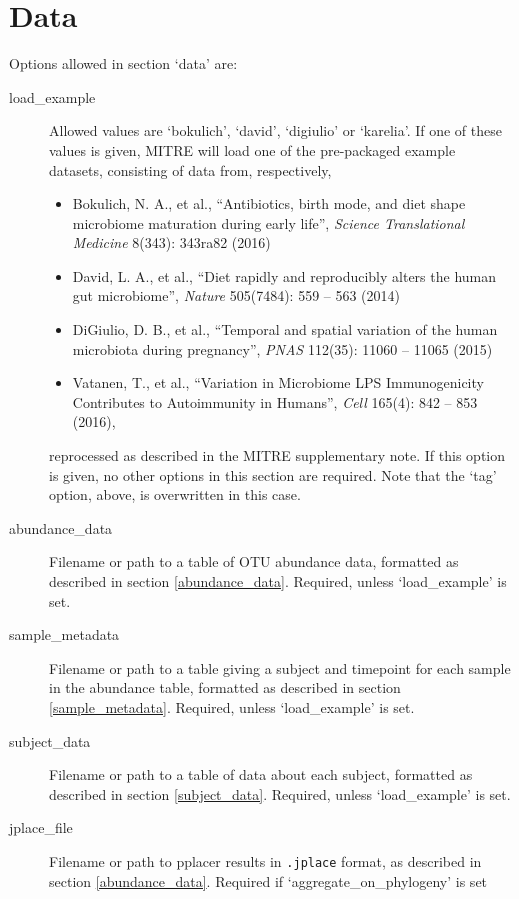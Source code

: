 \documentclass[12pt]{report}
\begin{document}
\section{Data}\label{data}
Options allowed in section `data' are:
\begin{description}
\item[load\_example] Allowed values are `bokulich', `david',
  `digiulio' or `karelia'. If one of these values is given,
  MITRE will load one of the pre-packaged example datasets, consisting
  of data from, respectively, \begin{itemize}
  \item Bokulich, N. A., et al., ``Antibiotics, birth mode, and diet
    shape microbiome maturation during early life'', \textit{Science
      Translational Medicine} 8(343): 343ra82 (2016)
  \item David, L. A., et al., ``Diet rapidly and reproducibly alters
    the human gut microbiome'', \textit{Nature} 505(7484): 559 -- 563
    (2014)
  \item DiGiulio, D. B., et al., ``Temporal and spatial variation of
    the human microbiota during pregnancy'', \textit{PNAS} 112(35):
    11060 -- 11065 (2015)
  \item Vatanen, T., et al., ``Variation in Microbiome LPS
    Immunogenicity Contributes to Autoimmunity in Humans'',
    \textit{Cell} 165(4): 842 -- 853 (2016),
\end{itemize}
reprocessed as described in the MITRE supplementary note.  If this
option is given, no other options in this section are required. Note
that the `tag' option, above, is overwritten in this case.
\item[abundance\_data] Filename or path to a table of OTU abundance
  data, formatted as described in section
  \ref{abundance_data}. Required, unless `load\_example' is set.
\item[sample\_metadata]
  Filename or path to a table giving a subject and timepoint for each
  sample in the abundance table, formatted as described in section
  \ref{sample_metadata}. Required, unless `load\_example' is set.
\item[subject\_data]
  Filename or path to a table of data about each subject,
  formatted as described in section
  \ref{subject_data}. Required, unless `load\_example' is set.
\item[jplace\_file] Filename or path to pplacer results in
  \texttt{.jplace} format, as described in section
  \ref{abundance_data}. Required if `aggregate\_on\_phylogeny' is set

\end{description}
\end{document}
